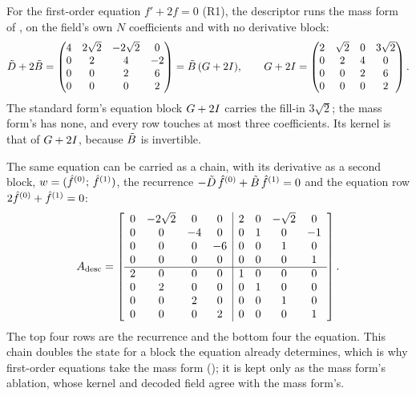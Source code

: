 For the first-order equation $f' + 2f = 0$ (R1), the descriptor runs the mass form of , on the field's own $N$ coefficients and with no derivative block:
\begin{equation}
    \tilde{D} + 2\tilde{B} =
    \begin{pmatrix}
        4 & 2\sqrt{2} & -2\sqrt{2} & 0 \\
        0 & 2 & 4 & -2 \\
        0 & 0 & 2 & 6 \\
        0 & 0 & 0 & 2
    \end{pmatrix}
    = \tilde{B}\,(G + 2I) ,
    \qquad
    G + 2I =
    \begin{pmatrix}
        2 & \sqrt{2} & 0 & 3\sqrt{2} \\
        0 & 2 & 4 & 0 \\
        0 & 0 & 2 & 6 \\
        0 & 0 & 0 & 2
    \end{pmatrix} .
    \label{eq:app-mass-form-n4}
\end{equation}
The standard form's equation block $G+2I$ carries the fill-in $3\sqrt2$; the mass form's has none, and every row touches at most three coefficients. Its kernel is that of $G+2I$, because $\tilde{B}$ is invertible.

The same equation can be carried as a chain, with its derivative as a second block, $w = (\hat{f}^{(0)};\, \hat{f}^{(1)})$, the recurrence $-\tilde{D}\,\hat{f}^{(0)} + \tilde{B}\,\hat{f}^{(1)} = 0$ and the equation row $2\hat{f}^{(0)} + \hat{f}^{(1)} = 0$:
\begin{equation}
    A_{\mathrm{desc}} =
    \left[
    \begin{array}{cccc|cccc}
        0 & -2\sqrt{2} & 0 & 0 & 2 & 0 & -\sqrt{2} & 0 \\
        0 & 0 & -4 & 0 & 0 & 1 & 0 & -1 \\
        0 & 0 & 0 & -6 & 0 & 0 & 1 & 0 \\
        0 & 0 & 0 & 0 & 0 & 0 & 0 & 1 \\ \hline
        2 & 0 & 0 & 0 & 1 & 0 & 0 & 0 \\
        0 & 2 & 0 & 0 & 0 & 1 & 0 & 0 \\
        0 & 0 & 2 & 0 & 0 & 0 & 1 & 0 \\
        0 & 0 & 0 & 2 & 0 & 0 & 0 & 1
    \end{array}
    \right] .
    \label{eq:app-descriptor-8x8}
\end{equation}
The top four rows are the recurrence and the bottom four the equation. This chain doubles the state for a block the equation already determines, which is why first-order equations take the mass form (); it is kept only as the mass form's ablation, whose kernel and decoded field agree with the mass form's.
